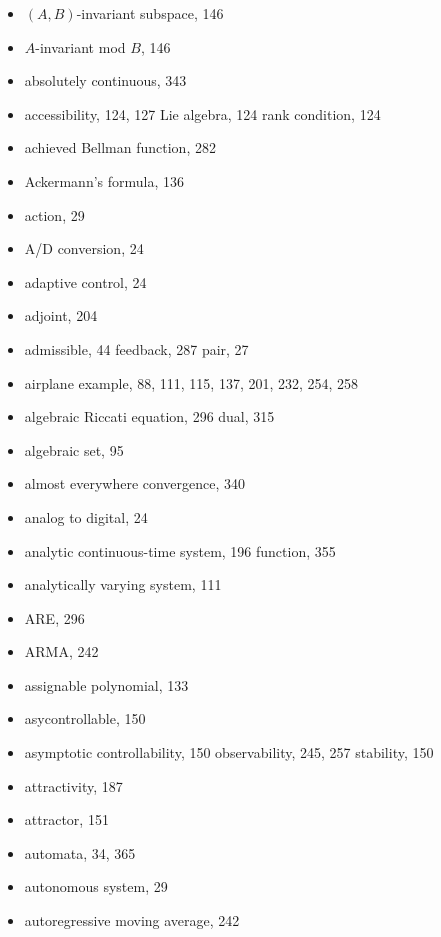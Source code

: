 \topmargin -0.5in
\textheight 8.8in
\oddsidemargin 0.0in
\evensidemargin 0.0in
\textwidth 6.7in




\begin{itemize}
\def\indexspace{\vskip5pt}
\def\longentry{}

  \item $(A,B)$-invariant subspace, 146
  \item $A$-invariant mod $B$, 146
  \item absolutely continuous, 343
  \item accessibility, 124, 127
    \subitem Lie algebra, 124
    \subitem rank condition, 124
  \item achieved Bellman function, 282
  \item Ackermann's formula, 136
  \item action, 29
  \item A/D conversion, 24
  \item adaptive control, 24
  \item adjoint, 204
  \item admissible, 44
    \subitem feedback, 287
    \subitem pair, 27
  \item airplane example, 88, 111, 115, 137, 201, 232, 254, 258
  \item algebraic Riccati equation, 296
    \subitem dual, 315
  \item algebraic set, 95
  \item almost everywhere convergence, 340
  \item analog to digital, 24
  \item analytic
    \subitem continuous-time system, 196
    \subitem function, 355
  \item analytically varying system, 111
  \item ARE, 296
  \item ARMA, 242
  \item assignable polynomial, 133
  \item asycontrollable, 150
  \item asymptotic
    \subitem controllability, 150
    \subitem observability, 245, 257
    \subitem stability, 150
  \item attractivity, 187
  \item attractor, 151
  \item automata, 34, 365
  \item autonomous system, 29
  \item autoregressive moving average, 242


\end{itemize}
